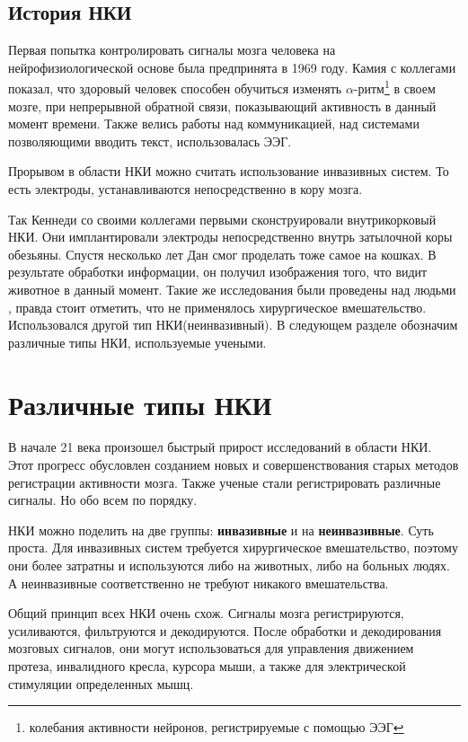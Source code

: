 \subsection*{История НКИ}
Первая попытка контролировать сигналы мозга человека на нейрофизиологической основе была предпринята в 1969 году. Камия с коллегами показал, что здоровый человек способен обучиться изменять $\alpha$-ритм\footnote{колебания активности нейронов, регистрируемые с помощью ЭЭГ} в своем мозге, при непрерывной обратной связи, показывающий активность в данный момент времени. Также велись работы над коммуникацией, над системами позволяющими вводить текст, использовалась ЭЭГ.

Прорывом в области НКИ можно считать использование инвазивных систем. То есть электроды, устанавливаются непосредственно в кору мозга.

Так Кеннеди со своими коллегами первыми сконструировали внутрикорковый НКИ. Они имплантировали электроды непосредственно внутрь затылочной коры обезьяны.
Спустя несколько лет Дан смог проделать тоже самое на кошках. В результате обработки информации, он получил изображения того, что видит животное в данный момент. Такие же исследования были проведены над людьми \cite{image}, правда стоит отметить, что не применялось хирургическое вмешательство. Использовался другой тип НКИ(неинвазивный). В следующем разделе обозначим различные типы НКИ, используемые учеными.

\section{Различные типы НКИ}
В начале 21 века произошел быстрый прирост исследований в области НКИ. Этот прогресс обусловлен созданием новых и совершенствования старых методов регистрации активности мозга. Также ученые стали регистрировать различные сигналы. Но обо всем по порядку.

НКИ можно поделить на две группы: {\bf инвазивные} и на {\bf неинвазивные}. Суть проста. Для инвазивных систем требуется хирургическое вмешательство, поэтому они более затратны и используются либо на животных, либо на больных людях. А неинвазивные соответственно не требуют никакого вмешательства.

Общий принцип всех НКИ очень схож. Сигналы мозга регистрируются, усиливаются, фильтруются и декодируются. После обработки и декодирования мозговых сигналов, они могут использоваться для управления движением протеза, инвалидного кресла, курсора мыши, а также для электрической стимуляции определенных мышц.

